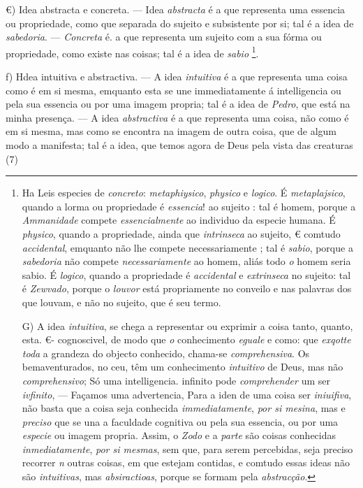 €) Idea abstracta e concreta. --- Idea \emph{abstracta} é a que representa uma essencia ou propriedade, como que separada do sujeito e subsistente por si; tal é a idea de \emph{sabedoria}. --- \emph{Concreta} é. a que representa um sujeito com a sua fórma ou propriedade, como existe nas coisas; tal é a idea de \emph{sabio} \footnote{Ha Leis especies de \emph{concreto}: \emph{metaphiysico}, \emph{physico} e \emph{logico}. É \emph{metaplajsico}, quando a lorma ou propriedade é \emph{essencia}! ao sujeito : tal é homem, porque a \emph{Ammanidade} compete \emph{essencialmente} ao individuo da especie humana. É \emph{physico}, quando a propriedade, ainda que \emph{intrinseca} ao sujeito, € comtudo \emph{accidental}, emquanto não lhe compete necessariamente ; tal é \emph{sabio}, porque a \emph{sabedoria} não compete \emph{necessariamente} ao homem, aliás todo \emph{o} homem seria sabio. É \emph{logico}, quando a propriedade é \emph{accidental} e \emph{extrinseca} no sujeito: tal é \emph{Zewvado}, porque o \emph{louvor} está propriamente no conveilo e nas palavras dos que louvam, e não no sujeito, que é seu termo.\par G) A idea \emph{intuitiva}, se chega a representar ou exprimir a coisa tanto, quanto, esta. €- cognoscivel, de modo que \emph{o} conhecimento \emph{eguale} e como: que \emph{exqotte toda} a grandeza do objecto conhecido, chama-se \emph{comprehensiva}. Os bemaventurados, no ceu, têm um conhecimento \emph{intuitivo} de Deus, mas não \emph{comprehensivo}; Só uma intelligencia. infinito pode \emph{comprehender} um ser \emph{ivfinito}, --- Façamos uma advertencia, Para a iden de uma coisa ser \emph{iniuifiva}, não basta que a coisa seja conhecida \emph{immediatamente}, \emph{por si mesina}, mas e \emph{preciso} que se una a faculdade cognitiva ou pela sua essencia, ou por uma \emph{especie} ou imagem propria. Assim, o \emph{Zodo} e a \emph{parte} são coisas conhecidas \emph{inmediatamente}, \emph{por si mesmas}, sem que, para serem percebidas, seja preciso recorrer \emph{n} outras coisas, em que estejam contidas, e comtudo essas ideas não são \emph{intuitivas}, mas \emph{absiractioas}, porque se formam pela \emph{abstracção}.}.

f) Hdea intuitiva e abstractiva. --- A idea \emph{intuitiva} é a que representa uma coisa como é em si mesma, emquanto esta se une immediatamente á intelligencia ou pela sua essencia ou por uma imagem propria; tal é a idea de \emph{Pedro}, que está na minha presença. --- A idea \emph{abstractiva} é a que representa uma coisa, não como é em si mesma, mas como se encontra na imagem de outra coisa, que de algum modo a manifesta; tal é a idea, que temos agora de Deus pela vista das creaturas (7)

